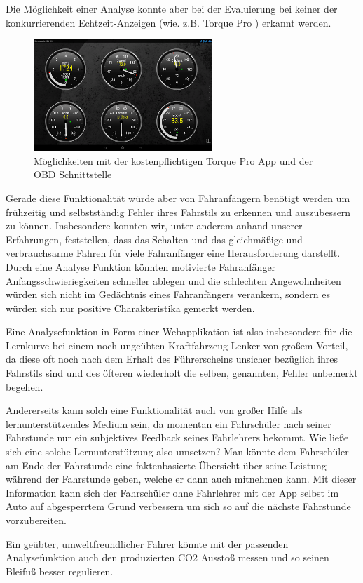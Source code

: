 Die Möglichkeit einer Analyse konnte aber bei der Evaluierung bei keiner der konkurrierenden Echtzeit-Anzeigen (wie. z.B. Torque Pro \cite{SIMR.CH1-Fahrstil-Analyse.TorquePro}) erkannt werden. 

\begin{figure}[!htb]\centering
	\includegraphics[width=0.6\textwidth]{images/torquePro}
	\caption{Möglichkeiten mit der kostenpflichtigen Torque Pro App und der OBD Schnittstelle \cite{SIMR.CH1-Fahrstil-Analyse.TorquePro}}\label{Fig:imgGTR}
\end{figure}

Gerade diese Funktionalität würde aber von Fahranfängern benötigt werden um frühzeitig und selbstständig Fehler ihres Fahrstils zu erkennen und auszubessern zu können. Insbesondere konnten wir, unter anderem anhand unserer Erfahrungen, feststellen, dass das Schalten und das gleichmäßige und verbrauchsarme Fahren für viele Fahranfänger eine Herausforderung darstellt. Durch eine Analyse Funktion könnten motivierte Fahranfänger Anfangsschwieriegkeiten schneller ablegen und die schlechten Angewohnheiten würden sich nicht im  Gedächtnis eines Fahranfängers verankern, sondern es würden sich nur positive Charakteristika gemerkt werden.  

Eine Analysefunktion in Form einer Webapplikation ist also insbesondere für die Lernkurve bei einem noch ungeübten Kraftfahrzeug-Lenker von großem Vorteil, da diese oft noch nach dem Erhalt des Führerscheins unsicher bezüglich ihres Fahrstils sind und des öfteren wiederholt die selben, genannten, Fehler unbemerkt begehen.

Andererseits kann solch eine Funktionalität auch von großer Hilfe als lernunterstützendes Medium sein, da momentan ein Fahrschüler nach seiner Fahrstunde nur ein subjektives Feedback seines Fahrlehrers bekommt. Wie ließe sich eine solche Lernunterstützung also umsetzen?
Man könnte dem Fahrschüler am Ende der Fahrstunde eine faktenbasierte Übersicht über seine Leistung während der Fahrstunde geben, welche er dann auch mitnehmen kann. Mit dieser Information kann sich der Fahrschüler ohne Fahrlehrer mit der App selbst im Auto auf abgesperrtem Grund verbessern um sich so auf die nächste Fahrstunde vorzubereiten.

Ein geübter, umweltfreundlicher Fahrer könnte mit der passenden Analysefunktion auch den produzierten CO2 Ausstoß messen und so seinen Bleifuß besser regulieren.
\clearpage %
